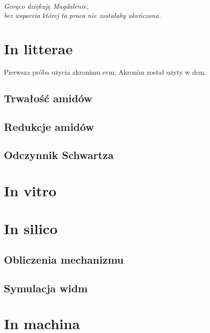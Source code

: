 \documentclass[a4paper, justified, nobib]{tufte-book}
\begin{document}
\frontmatter
\maketitle

\cleardoublepage
\thispagestyle{empty}
~\vfill
\vfill
\begin{fullwidth}
\begin{doublespace}
\raggedleft\noindent\fontsize{16}{20}\selectfont\itshape
\nohyphenation
Gorąco dziękuję Magdalenie,\\
bez wsparcia której ta praca nie zostałaby ukończona.
\end{doublespace}
\end{fullwidth}
\vfill

\tableofcontents



\mainmatter
\chapter{In litterae}
Pierwsza próba użycia akronimu \gls{svm}. Akronim został użyty w \gls{dcm}.
\section{Trwałość amidów}
\section{Redukcje amidów}
\section{Odczynnik Schwartza}

\chapter{In vitro}

\chapter{In silico}
\section{Obliczenia mechanizmu}
\section{Symulacja widm}

\chapter{In machina}
\end{document}

